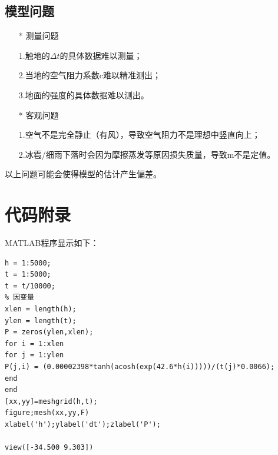 \documentclass[a4paper,AutoFakeBold,AutoFakeSlant]{ctexart}
\begin{document}
\subsection{模型问题}
\begin{itemize}
  \item[*] 测量问题

1.触地的$ \Delta t $的具体数据难以测量；

2.当地的空气阻力系数c难以精准测出；

3.地面的强度的具体数据难以测出。
\end{itemize}
\begin{itemize}
  \item[*] 客观问题

1.空气不是完全静止（有风），导致空气阻力不是理想中竖直向上；

2.冰雹/细雨下落时会因为摩擦蒸发等原因损失质量，导致m不是定值。
\end{itemize}

以上问题可能会使得模型的估计产生偏差。

\section*{代码附录}
\textsc{MATLAB}程序显示如下：
\begin{lstlisting}[frame=single]
h = 1:5000;
t = 1:5000;
t = t/10000;
% 因变量
xlen = length(h);
ylen = length(t);
P = zeros(ylen,xlen);
for i = 1:xlen
for j = 1:ylen
P(j,i) = (0.00002398*tanh(acosh(exp(42.6*h(i)))))/(t(j)*0.0066);
end
end
[xx,yy]=meshgrid(h,t);
figure;mesh(xx,yy,F)
xlabel('h');ylabel('dt');zlabel('P');

view([-34.500 9.303])
\end{lstlisting}



\end{document}
